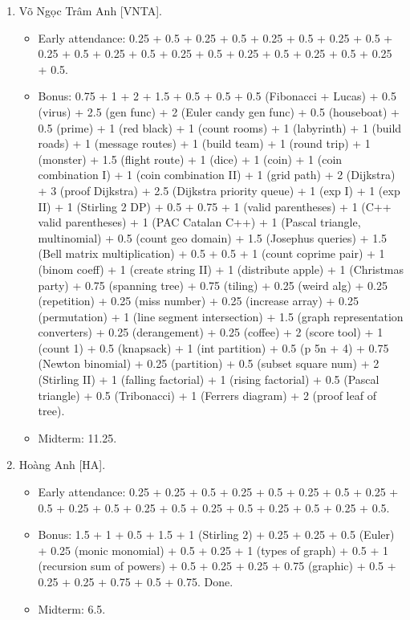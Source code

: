 \documentclass{article}
\begin{document}
\begin{enumerate}
	\item {\sc Võ Ngọc Trâm Anh [VNTA].}
	\begin{itemize}
		\item Early attendance: 0.25 + 0.5 + 0.25 + 0.5 + 0.25 + 0.5 + 0.25 + 0.5 + 0.25 + 0.5 + 0.25 + 0.5 + 0.25 + 0.5 + 0.25 + 0.5 + 0.25 + 0.5 + 0.25 + 0.5.
		\item Bonus: 0.75 + 1 + 2 + 1.5 + 0.5 + 0.5 + 0.5 (Fibonacci + Lucas) + 0.5 (virus) + 2.5 (gen func) + 2 (Euler candy gen func) + 0.5 (houseboat) + 0.5 (prime) + 1 (red black) + 1 (count rooms) + 1 (labyrinth) + 1 (build roads) + 1 (message routes) + 1 (build team) + 1 (round trip) + 1 (monster) + 1.5 (flight route) + 1 (dice) + 1 (coin) + 1 (coin combination I) + 1 (coin combination II) + 1 (grid path) + 2 (Dijkstra) + 3 (proof Dijkstra) + 2.5 (Dijkstra priority queue) + 1 (exp I) + 1 (exp II) + 1 (Stirling 2 DP) + 0.5 + 0.75 + 1 (valid parentheses) + 1 (C++ valid parentheses) + 1 (PAC Catalan C++) + 1 (Pascal triangle, multinomial) + 0.5 (count geo domain) + 1.5 (Josephus queries) + 1.5 (Bell matrix multiplication) + 0.5 + 0.5 + 1 (count coprime pair) + 1 (binom coeff) + 1 (create string II) + 1 (distribute apple) + 1 (Christmas party) + 0.75 (spanning tree) + 0.75 (tiling) + 0.25 (weird alg) + 0.25 (repetition) + 0.25 (miss number) + 0.25 (increase array) + 0.25 (permutation) + 1 (line segment intersection) + 1.5 (graph representation converters) + 0.25 (derangement) + 0.25 (coffee) + 2 (score tool) + 1 (count 1) + 0.5 (knapsack) + 1 (int partition) + 0.5 (p 5n + 4) + 0.75 (Newton binomial) + 0.25 (partition) + 0.5 (subset square num) + 2 (Stirling II) + 1 (falling factorial) + 1 (rising factorial) + 0.5 (Pascal triangle) + 0.5 (Tribonacci) + 1 (Ferrers diagram) + 2 (proof leaf of tree).
        \item Midterm: 11.25.
	\end{itemize}
	\item {\sc Hoàng Anh [HA].}
	\begin{itemize}
		\item Early attendance: 0.25 + 0.25 + 0.5 + 0.25 + 0.5 + 0.25 + 0.5 + 0.25 + 0.5 + 0.25 + 0.5 + 0.25 + 0.5 + 0.25 + 0.5 + 0.25 + 0.5 + 0.25 + 0.5.
		\item Bonus: 1.5 + 1 + 0.5 + 1.5 + 1 (Stirling 2) + 0.25 + 0.25 + 0.5 (Euler) + 0.25 (monic monomial) + 0.5 + 0.25 + 1 (types of graph) + 0.5 + 1 (recursion sum of powers) + 0.5 + 0.25 + 0.25 + 0.75 (graphic) + 0.5 + 0.25 + 0.25 + 0.75 + 0.5 + 0.75. Done.
        \item Midterm: 6.5.

\end{itemize}
\end{enumerate}
\end{document}
